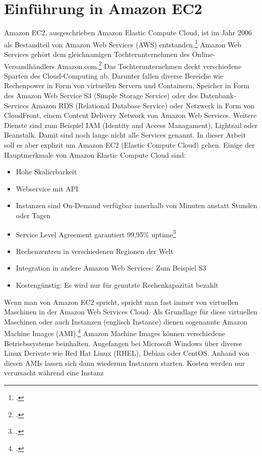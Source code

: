 \documentclass[titlepage]{report}
\begin{document}
\section*{Einführung in Amazon EC2}
Amazon EC2, ausgeschrieben Amazon Elastic Compute Cloud, ist im Jahr
2006 als Bestandteil von Amazon Web Services (AWS)
entstanden.\footcite{aws} Amazon Web Services gehört dem gleichnamigen
Tochterunternehmen des Online\hyp{}Versandhändlers Amazon.com.\footcite{Fou}
Das Tochterunternehmen deckt verschiedene Sparten des Cloud\hyp{}Computing
ab. Darunter fallen diverse Bereiche wie Rechenpower in Form von
virtuellen Servern und Containern, Speicher in Form des Amazon Web
Service S3 (Simple Storage Service) oder des Datenbank\hyp{}Services Amazon
RDS (Relational Database Service) oder Netzwerk in Form von CloudFront,
einem Content Delivery Network von Amazon Web Services. Weitere Dienste
sind zum Beispiel IAM (Identity and Access Managament), Lightsail oder Beanstalk.
Damit sind noch lange nicht alle Services genannt. In dieser Arbeit soll
es aber explizit um Amazon EC2 (Elastic Compute Cloud) gehen. Einige der
Hauptmerkmale von Amazon Elastic Compute Cloud sind:
\begin{itemize}
    \item Hohe Skalierbarkeit
    \item Webservice mit API
    \item Instanzen sind On\hyp{}Demand verfügbar innerhalb von Minuten anstatt
      Stunden oder Tagen
    \item Service Level Agreement garantiert 99,95\% uptime\footcite{ec2}
    \item Rechenzentren in verschiedenen Regionen der Welt
    \item Integration in andere Amazon Web Services: Zum Beispiel S3
    \item Kostengünstig: Es wird nur für genutzte Rechenkapazität bezahlt
\end{itemize}
Wenn man von Amazon EC2 spricht, spricht man fast immer von virtuellen
Maschinen in der Amazon Web Services Cloud. Als Grundlage für diese
virtuellen Maschinen oder auch Instanzen (englisch Instance) dienen
sogenannte Amazon Machine Images (AMI).\footcite{ec2details} Amazon Machine
Images können verschiedene Betriebssysteme beinhalten. Angefangen bei
Microsoft Windows über diverse Linux Derivate wie Red Hat Linux (RHEL),
Debian oder CentOS. Anhand von diesen AMIs lassen sich dann wiederum
Instanzen starten. Kosten werden nur verursacht während eine Instanz
\end{document}
